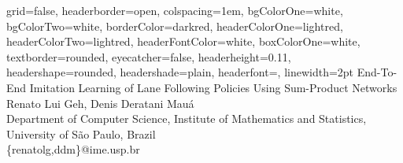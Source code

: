 \documentclass[a0paper,portrait]{baposter}
\begin{document}

\begin{poster}
{
grid=false,
headerborder=open, %
colspacing=1em, %
bgColorOne=white, %
bgColorTwo=white, %
borderColor=darkred, %
headerColorOne=lightred, %
headerColorTwo=lightred, %
headerFontColor=white, %
boxColorOne=white, %
textborder=rounded, %
eyecatcher=false, %
headerheight=0.11\textheight, %
headershape=rounded, %
headershade=plain,
headerfont=\Large\textsf, %
linewidth=2pt %
}
{}
%
%
{
\textsf %
{End-To-End Imitation Learning of Lane Following Policies Using Sum-Product Networks
}
}
{\sf\vspace{0.01em}\\
Renato Lui Geh, Denis Deratani Mauá
\vspace{0.1em}\\
\small{Department of Computer Science, Institute of Mathematics and Statistics, University of São
  Paulo, Brazil
\vspace{0.2em}\\
\{renatolg,ddm\}@ime.usp.br}
}

\end{poster}
\end{document}
